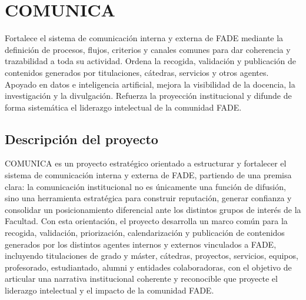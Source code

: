 \documentclass[11pt,a4paper]{scrreprt}
\begin{document}
\clearpage

\chapter[COMUNICA]{\textcolor{comcolor}{COMUNICA}}
\begin{tcolorbox}[descbox]
\small Fortalece el sistema de comunicación interna y externa de FADE mediante la definición de procesos, flujos, criterios y canales comunes para dar coherencia y trazabilidad a toda su actividad. Ordena la recogida, validación y publicación de contenidos generados por titulaciones, cátedras, servicios y otros agentes. Apoyado en datos e inteligencia artificial, mejora la visibilidad de la docencia, la investigación y la divulgación. Refuerza la proyección institucional y difunde de forma sistemática el liderazgo intelectual de la comunidad FADE.
\end{tcolorbox}
\section{Descripción del proyecto}

\small
COMUNICA es un proyecto estratégico orientado a estructurar y fortalecer el sistema de comunicación interna y externa de FADE, partiendo de una premisa clara: la comunicación institucional no es únicamente una función de difusión, sino una herramienta estratégica para construir reputación, generar confianza y consolidar un posicionamiento diferencial ante los distintos grupos de interés de la Facultad. Con esta orientación, el proyecto desarrolla un marco común para la recogida, validación, priorización, calendarización y publicación de contenidos generados por los distintos agentes internos y externos vinculados a FADE, incluyendo titulaciones de grado y máster, cátedras, proyectos, servicios, equipos, profesorado, estudiantado, alumni y entidades colaboradoras, con el objetivo de articular una narrativa institucional coherente y reconocible que proyecte el liderazgo intelectual y el impacto de la comunidad FADE.
\end{document}
